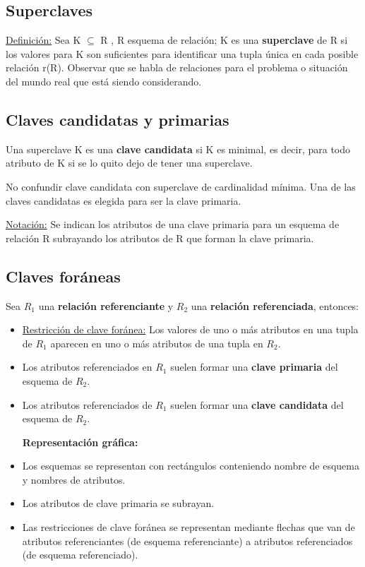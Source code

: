 \documentclass[12pt,a4paper]{report}
\begin{document}
		\subsection{Superclaves}
			\underline{Definición:} Sea K $\subseteq$ R , R esquema de relación; K es una \textbf{superclave} de R si los valores para K son suficientes para identificar una tupla única en cada posible relación r(R). Observar que se habla de relaciones para el problema o situación del mundo real que está siendo considerando.
		
		\subsection{Claves candidatas y primarias}
			\par Una superclave K es una \textbf{clave candidata} si K es minimal, es decir, para todo atributo de K si se lo quito dejo de tener una superclave.
			\par No confundir clave candidata con superclave de cardinalidad mínima. Una de las claves candidatas es elegida para ser la clave primaria.
			\vspace{5mm}
			\par \underline{Notación:} Se indican los atributos de una clave primaria para un esquema de relación R subrayando los atributos de R que forman la clave primaria.

		\subsection{Claves foráneas}
			\par Sea $R_{1}$ una \textbf{relación referenciante} y $R_{2}$ una \textbf{relación referenciada}, entonces:
			\begin{itemize}
				\item \underline{Restricción de clave foránea:} Los valores de uno o más atributos en una tupla de $R_{1}$ aparecen en uno o más atributos de una tupla en $R_{2}$.
				\item Los atributos referenciados en $R_{1}$ suelen formar una \textbf{clave primaria} del esquema de $R_{2}$.
				\item Los atributos referenciados de $R_{1}$ suelen formar una \textbf{clave candidata }del esquema de $R_{2}$.
				
				\vspace{5mm}
				\textbf{Representación gráfica:}
				\item Los esquemas se representan con rectángulos conteniendo nombre de esquema y nombres de atributos.
				\item Los atributos de clave primaria se subrayan.
				\item Las restricciones de clave foránea se representan mediante flechas que van de atributos referenciantes (de esquema referenciante) a atributos referenciados (de esquema referenciado).
			\end{itemize}
\end{document}
